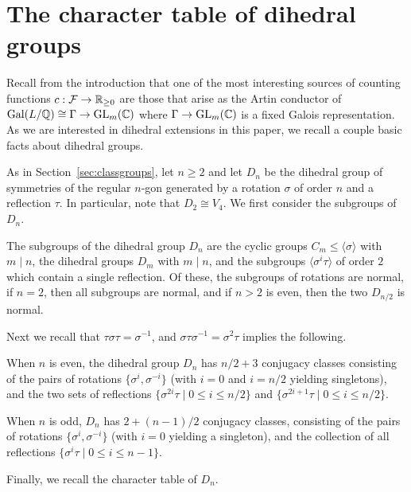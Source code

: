 \section{The character table of dihedral groups}\label{sec:dihedralgroups}

Recall from the introduction that one of the most interesting sources of
counting functions $c : \mathcal{F} \to \mathbb{R}_{\geq 0}$ are those that arise as the Artin
conductor of $\operatorname{Gal}(L/\mathbb{Q}) \cong \Gamma \to \operatorname{GL}_m(\mathbb{C})$ where $\Gamma \to
\operatorname{GL}_m(\mathbb{C})$ is a fixed Galois representation. As we are interested in dihedral
extensions in this paper, we recall a couple basic facts about dihedral groups.

As in Section~\ref{sec:classgroups}, let $n \geq 2$ and let $D_n$ be the
dihedral group of symmetries of the regular $n$-gon generated by a rotation
$\sigma$ of order $n$ and a reflection $\tau$. In particular, note that $D_2
\cong V_4$. We first consider the subgroups of $D_n$.

\begin{prop}\label{prop:dnsubgroups}
  The subgroups of the dihedral group $D_n$ are the cyclic groups $C_m \leq
\langle \sigma \rangle$ with $m \mid n$, the dihedral groups $D_m$ with $m \mid
n$, and the subgroups $\langle \sigma^i \tau \rangle$ of order $2$ which
contain a single reflection. Of these, the subgroups of rotations are normal,
if $n = 2$, then all subgroups are normal, and if $n > 2$ is even, then the two
$D_{n/2}$ is normal.
\end{prop}

Next we recall that $\tau\sigma\tau = \sigma^{-1}$, and $\sigma\tau\sigma^{-1}
= \sigma^2\tau$ implies the following.

\begin{prop}\label{prop:dnconjclasses}
  When $n$ is even, the dihedral group $D_n$ has $n/2 + 3$ conjugacy classes
consisting of the pairs of rotations $\{ \sigma^i, \sigma^{-i} \}$ (with $i =
0$ and $i = n/2$ yielding singletons), and the two sets of reflections $\{
\sigma^{2i}\tau \mid 0 \leq i \leq n/2 \}$ and $\{ \sigma^{2i+1}\tau \mid 0
\leq i \leq n/2 \}$.

  When $n$ is odd, $D_n$ has $2 + (n - 1)/2$ conjugacy classes, consisting of
the pairs of rotations $\{ \sigma^i, \sigma^{-i} \}$ (with $i = 0$ yielding a
singleton), and the collection of all reflections $\{ \sigma^i\tau \mid 0 \leq
i \leq n - 1 \}$.
\end{prop}

Finally, we recall the character table of $D_n$.

